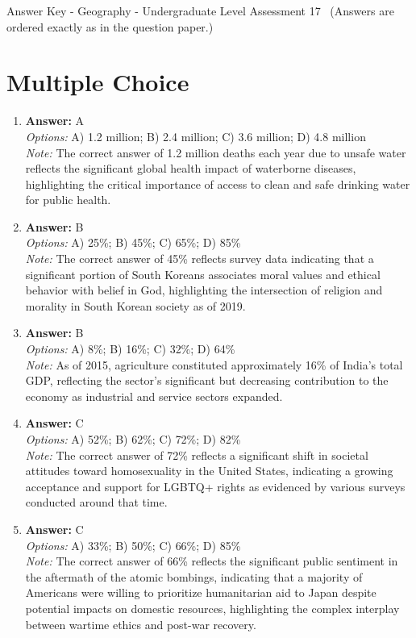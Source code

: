 \documentclass[12pt]{article}
\begin{document}
\begin{center}
Answer Key - Geography - Undergraduate Level Assessment 17 \
\small (Answers are ordered exactly as in the question paper.)
\end{center}

\section*{Multiple Choice}
\begin{enumerate}[label=\arabic*.]
\item \textbf{Answer:} A
\\ \textit{Options:} A) 1.2 million; B) 2.4 million; C) 3.6 million; D) 4.8 million
\\ \textit{Note:} The correct answer of 1.2 million deaths each year due to unsafe water reflects the significant global health impact of waterborne diseases, highlighting the critical importance of access to clean and safe drinking water for public health.
\item \textbf{Answer:} B
\\ \textit{Options:} A) 25\%; B) 45\%; C) 65\%; D) 85\%
\\ \textit{Note:} The correct answer of 45\% reflects survey data indicating that a significant portion of South Koreans associates moral values and ethical behavior with belief in God, highlighting the intersection of religion and morality in South Korean society as of 2019.
\item \textbf{Answer:} B
\\ \textit{Options:} A) 8\%; B) 16\%; C) 32\%; D) 64\%
\\ \textit{Note:} As of 2015, agriculture constituted approximately 16\% of India's total GDP, reflecting the sector's significant but decreasing contribution to the economy as industrial and service sectors expanded.
\item \textbf{Answer:} C
\\ \textit{Options:} A) 52\%; B) 62\%; C) 72\%; D) 82\%
\\ \textit{Note:} The correct answer of 72\% reflects a significant shift in societal attitudes toward homosexuality in the United States, indicating a growing acceptance and support for LGBTQ+ rights as evidenced by various surveys conducted around that time.
\item \textbf{Answer:} C
\\ \textit{Options:} A) 33\%; B) 50\%; C) 66\%; D) 85\%
\\ \textit{Note:} The correct answer of 66\% reflects the significant public sentiment in the aftermath of the atomic bombings, indicating that a majority of Americans were willing to prioritize humanitarian aid to Japan despite potential impacts on domestic resources, highlighting the complex interplay between wartime ethics and post-war recovery.
\end{enumerate}
\end{document}
